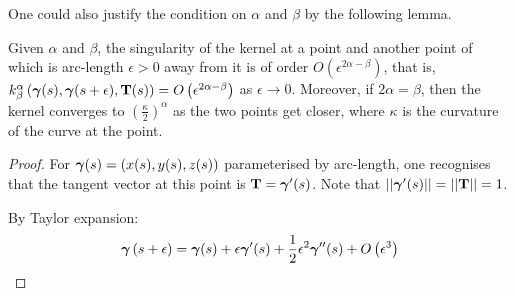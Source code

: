 \documentclass[../dissertation.tex]{subfiles}
\begin{document}
One could also justify the condition on $\alpha$ and $\beta$ by the following lemma.
\begin{lemma}
    \label{lemma: Perturbation}
    Given $\alpha$ and $\beta$, the singularity of the kernel at a point and another point of which is arc-length $\epsilon > 0$ away from it is of order $O \left( \epsilon^{2\alpha - \beta} \right)$, that is, $k_{\beta}^{\alpha} \left( \boldsymbol{\gamma}(s), \boldsymbol{\gamma}(s+\epsilon), \mathbf{T}(s) \right) = O \left( \epsilon^{2\alpha-\beta} \right)$ as $\epsilon \rightarrow 0$. Moreover, if $2\alpha = \beta$, then the kernel converges to $\left( \frac{\kappa}{2} \right)^{\alpha}$ as the two points get closer, where $\kappa$ is the curvature of the curve at the point.
    \begin{proof}
        For $\boldsymbol{\gamma} (s) = \left( x(s), y(s), z(s) \right)$ parameterised by arc-length, one recognises that the tangent vector at this point is $\mathbf{T} = \boldsymbol{\gamma}'(s)$.
        Note that $\lvert \lvert \boldsymbol{\gamma}'(s) \rvert \rvert=\lvert \lvert \mathbf{T} \rvert \rvert = 1$.

        By Taylor expansion:
        \begin{equation}
            \boldsymbol{\gamma} \left( s + \epsilon \right) = \boldsymbol{\gamma} (s) + \epsilon \boldsymbol{\gamma}'(s) + \frac{1}{2} \epsilon^2 \boldsymbol{\gamma}''(s) + O \left( \epsilon^3 \right)
        \end{equation}


\end{proof}
\end{lemma}
\end{document}
